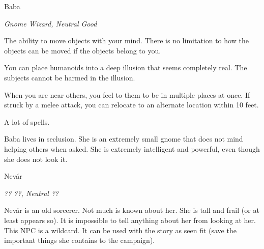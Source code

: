 \begin{monsterbox}{Baba}
	\begin{hangingpar}
		\textit{Gnome Wizard, Neutral Good}
	\end{hangingpar}
	\dndline%
	\basics[%
	armorclass = 24,
	hitpoints  = 302,
	speed      = 60 ft
	]
	\dndline%
	\stats[
	STR = \stat{8}, %
	DEX = \stat{16},
	CON = \stat{19},
	INT = \stat{20},
	WIS = \stat{20},
	CHA = \stat{19}
	]
	\dndline%
	\details[%
	languages = {Common, Elvish, Dwarvish, Gnomish, Halfling, Orc, Pandaren, Celestial, Draconic, Primordial},
	challenge = 20
	]
	\dndline%
	\begin{monsteraction}[Telekinesis]
		The ability to move objects with your mind. There is no limitation to how the objects can be moved if the objects belong to you.
	\end{monsteraction}	
	\begin{monsteraction}
		You can place humanoids into a deep illusion that seems completely real. The subjects cannot be harmed in the illusion.
	\end{monsteraction}	
	\begin{monsteraction}
		When you are near others, you feel to them to be in multiple places at once. If struck by a melee attack, you can relocate to an alternate location within 10 feet.
	\end{monsteraction}
	\begin{monsteraction}[Spells]
		A lot of spells.
	\end{monsteraction}
	Baba lives in seclusion. She is an extremely small gnome that does not mind helping others when asked. She is extremely intelligent and powerful, even though she does not look it.
\end{monsterbox}

\begin{monsterbox}{Nev\'{a}r}
	\begin{hangingpar}
		\textit{?? ??, Neutral ??}
	\end{hangingpar}
	\dndline%
	\basics[%
	armorclass = ??,
	hitpoints  = ??,
	speed      = ?? ft
	]
	\dndline%
	\stats[
	STR = \stat{}, %
	DEX = \stat{},
	CON = \stat{},
	INT = \stat{},
	WIS = \stat{},
	CHA = \stat{}
	]
	\dndline%
	\details[%
	languages = {Common},
	challenge = 20
	]
	\dndline%
	Nev\'{a}r is an old sorcerer. Not much is known about her. She is tall and frail (or at least appears so). It is impossible to tell anything about her from looking at her. This NPC is a wildcard. It can be used with the story as seen fit (save the important things she contains to the campaign).
\end{monsterbox}

